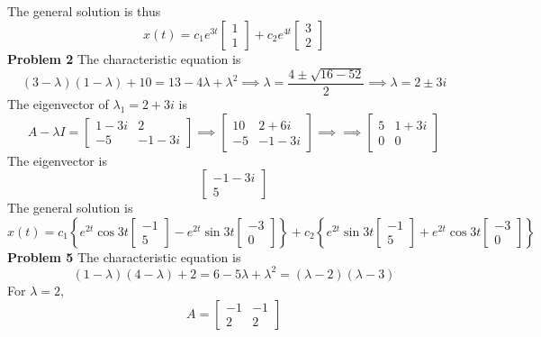 The general solution is thus 
\[
   x(t) = c_1e^{3t}
   \begin{bmatrix}
       1 \\ 1
   \end{bmatrix} +
   c_2e^{4t}
   \begin{bmatrix}
       3 \\ 2
   \end{bmatrix} 
\]
\textbf{Problem 2}
The characteristic equation is 
\[
    (3-\lambda)(1-\lambda) + 10
    = 13 - 4\lambda + \lambda^2
    \implies \lambda = \frac{4 \pm \sqrt{16-52}}{2}
    \implies \lambda = 2 \pm 3i
\]
The eigenvector of $\lambda_1 = 2 + 3i$ is 
\[
    A-\lambda I = \begin{bmatrix}
        1-3i & 2 \\
        -5 & -1-3i
    \end{bmatrix}
    \implies \begin{bmatrix}
        10 & 2+6i \\
        -5 & -1-3i
    \end{bmatrix}
    \implies 
    \implies \begin{bmatrix}
        5 & 1+3i \\
        0 & 0
    \end{bmatrix}
\]
The eigenvector is 
\[
    \begin{bmatrix}
        -1-3i \\ 5
    \end{bmatrix}
\]
The general solution is 
\[
    x(t) = c_1\left\{ 
        e^{2t}\cos 3t \begin{bmatrix} -1 \\ 5 \end{bmatrix} 
        - e^{2t}\sin 3t \begin{bmatrix} -3 \\ 0 \end{bmatrix} 
    \right\} + 
    c_2\left\{ 
        e^{2t}\sin 3t \begin{bmatrix} -1 \\ 5 \end{bmatrix} 
        + e^{2t}\cos 3t \begin{bmatrix} -3 \\ 0 \end{bmatrix} 
    \right\} 
\]
\textbf{Problem 5}
The characteristic equation is 
\[
    (1-\lambda)(4-\lambda)+2
    = 6 -5\lambda + \lambda^2
    = (\lambda-2)(\lambda-3)
\]
For $\lambda = 2$,
\[
    A = \begin{bmatrix}
        -1 & -1 \\
        2 & 2
    \end{bmatrix}
\]
